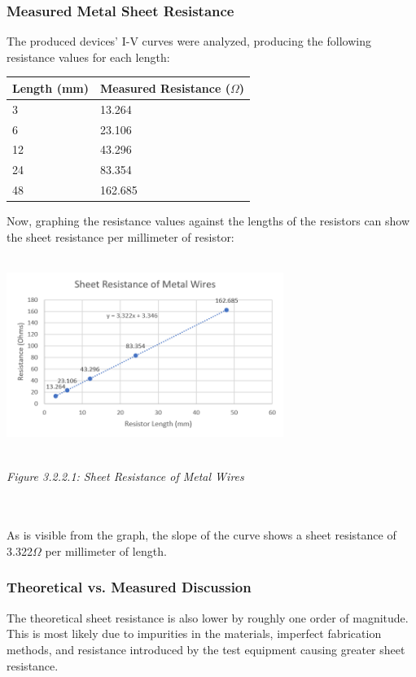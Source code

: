 \documentclass[12pt]{article}
\begin{document}
\subsubsection{Measured Metal Sheet Resistance}
The produced devices' I-V curves were analyzed, producing the following resistance values for each length:
\begin{center}
\begin{tabular}{|l|l|}
\hline
Length (mm) & Measured Resistance ($\Omega$) \\ \hline
3           & 13.264                         \\ \hline
6           & 23.106                         \\ \hline
12          & 43.296                         \\ \hline
24          & 83.354                         \\ \hline
48          & 162.685                        \\ \hline
\end{tabular}
\end{center}
Now, graphing the resistance values against the lengths of the resistors can show the sheet resistance per millimeter of resistor:
\\
\\\centerline{\includegraphics[width=9cm] {Metal Resistance.PNG}}
\begin{center}
\\\emph{Figure 3.2.2.1: Sheet Resistance of Metal Wires}
\end{center}
\\
\\As is visible from the graph, the slope of the curve shows a sheet resistance of 3.322$\Omega$ per millimeter of length. 

\subsubsection{Theoretical vs. Measured Discussion}
The theoretical sheet resistance is also lower by roughly one order of magnitude. This is most likely due to impurities in the materials, imperfect fabrication methods, and resistance introduced by the test equipment causing greater sheet resistance.
\end{document}
